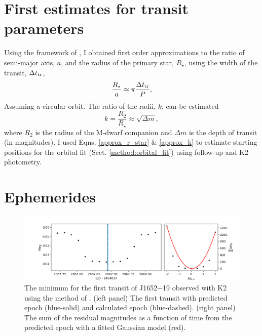 \section{First estimates for transit parameters}\label{methods:first_estimates}

Using the framework of \cite{2007ApJ...663..573B}, I obtained first order approximations to the ratio of semi-major axis, $a$, and the radius of the primary star, $R_{\star}$, using the width of the transit, $\Delta t_{\rm tr}$, 
%
\begin{equation}\label{approx_r_star}
\frac{R_{\star}}{a} \approx \pi \frac{\Delta t_{\rm tr}}{P},
\end{equation}
%
Assuming a circular orbit. The ratio of the radii, $k$, can be estimated
%
\begin{equation}\label{approx_k}
k = \frac{R_{2}}{R_{\star}} \approx \sqrt{\Delta m},
\end{equation}
%
where $R_2$ is the radius of the M-dwarf companion and $\Delta m$ is the depth of transit (in magnitudes). I used Eqns. \ref{approx_r_star} \& \ref{approx_k} to estimate starting positions for the orbital fit (Sect. \ref{method:orbital_fit}) using follow-up and K2 photometry.  



\section{Ephemerides}\label{ephem}

\begin{figure}
    \centering
    \includegraphics[scale=0.6]{7-images/1652-19_ephem.png}
    \caption{The minimum for the first transit of J1652$-$19 observed with K2 using the method of \protect\citet{1956BAN....12..327K}. (left panel) The first transit with predicted epoch (blue-solid) and calculated epoch (blue-dashed). (right panel) The sum of the residual magnitudes as a function of time from the predicted epoch with a fitted Gaussian model (red).}
    \label{method:fig:ephem1}
\end{figure}

